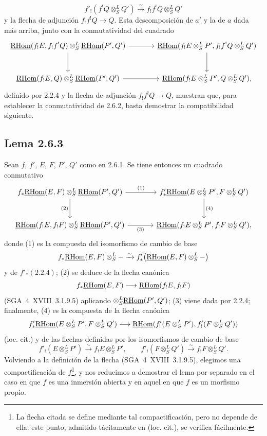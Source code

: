\[
f'_!(f^!Q\otimes^L_SQ')\xrightarrow{\sim}f_!f^!Q\otimes^L_SQ'
\]
y la flecha de adjunción $f_!f^!Q\to Q$. Esta descomposición de $a'$ y la de $a$ dada más arriba, junto con la conmutatividad del cuadrado
\[
\begin{tikzcd}[column sep=large,row sep=large]
\uRHom(f_!E,f_!f^!Q)\otimes^L_S\uRHom(P',Q') \arrow[r] \arrow[d] & \uRHom(f_!E\otimes^L_SP',f_!f^!Q\otimes^L_SQ') \arrow[d]\\
\uRHom(f_!E,Q)\otimes^L_S\uRHom(P',Q') \arrow[r] & \uRHom(f_!E\otimes^L_SP',Q\otimes^L_SQ'),
\end{tikzcd}
\]
definido por 2.2.4 y la flecha de adjunción $f_!f^!Q\to Q$, muestran que, para establecer la conmutatividad de 2.6.2, basta demostrar la compatibilidad siguiente.

\subsection*{Lema 2.6.3}
Sean $f$, $f'$, $E$, $F$, $P'$, $Q'$ como en 2.6.1. Se tiene entonces un cuadrado conmutativo
\[
\begin{tikzcd}[column sep=large,row sep=large]
f_*\uRHom(E,F)\otimes^L_S\uRHom(P',Q') \arrow[r,"(1)"] \arrow[d,"(2)"'] & f'_*\uRHom(E\otimes^L_SP',F\otimes^L_SQ') \arrow[d,"(4)"]\\
\uRHom(f_!E,f_!F)\otimes^L_S\uRHom(P',Q') \arrow[r,"(3)"'] & \uRHom(f_!E\otimes^L_SP',f_!F\otimes^L_SQ'),
\end{tikzcd}
\]
donde (1) es la compuesta del isomorfismo de cambio de base
\[
f_*\underline{\mathrm{RHom}}(E,F)\otimes^L_S -\xrightarrow{\sim}f'_*\bigl(\underline{\mathrm{RHom}}(E,F)\otimes^L_S-\bigr)
\]
y de $f'_*(2.2.4)$; (2) se deduce de la flecha canónica
\[
f_*\underline{\mathrm{RHom}}(E,F)\longrightarrow\underline{\mathrm{RHom}}(f_!E,f_!F)
\]
(SGA~4~XVIII~3.1.9.5) aplicando $\otimes^L_S\underline{\mathrm{RHom}}(P',Q')$; (3) viene dada por 2.2.4; finalmente, (4) es la compuesta de la flecha canónica
\[
f'_*\underline{\mathrm{RHom}}(E\otimes^L_SP',F\otimes^L_SQ')
\longrightarrow
\underline{\mathrm{RHom}}(f'_!(E\otimes^L_SP'),f'_!(F\otimes^L_SQ'))
\]
(loc. cit.) y de las flechas definidas por los isomorfismos de cambio de base
\[
f'_!(E\otimes^L_SP')\xrightarrow{\sim}f_!E\otimes^L_SP',
\qquad
f'_!(F\otimes^L_SQ')\xrightarrow{\sim}f_!F\otimes^L_SQ'.
\]
Volviendo a la definición de la flecha (SGA~4~XVIII~3.1.9.5), elegimos una compactificación de $f$\footnote{La flecha citada se define mediante tal compactificación, pero no depende de ella: este punto, admitido tácitamente en (loc. cit.), se verifica fácilmente.}, y nos reducimos a demostrar el lema por separado en el caso en que $f$ es una inmersión abierta y en aquel en que $f$ es un morfismo propio.

